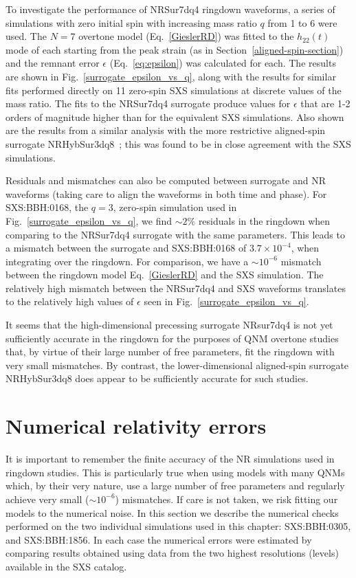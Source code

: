 To investigate the performance of NRSur7dq4 ringdown waveforms, a series of simulations with zero initial spin with increasing mass ratio $q$ from 1 to 6 were used. 
The $N=7$ overtone model (Eq.~\ref{GieslerRD}) was fitted to the $h_{22}(t)$ mode of each starting from the peak strain (as in Section~\ref{aligned-spin-section})
and the remnant error $\epsilon$ (Eq.~\ref{eq:epsilon}) was calculated for each.
The results are shown in Fig.~\ref{surrogate_epsilon_vs_q}, along with the results for similar fits performed directly on 11 zero-spin SXS simulations at discrete values of the mass ratio. 
The fits to the NRSur7dq4 surrogate produce values for $\epsilon$ that are 1-2 orders of magnitude higher than for the equivalent SXS simulations. 
Also shown are the results from a similar analysis with the more restrictive aligned-spin surrogate NRHybSur3dq8~\cite{Varma:2018mmi, Varma:2018aht}; this was found to be in close agreement with the SXS simulations.

Residuals and mismatches can also be computed between surrogate and NR waveforms (taking care to align the waveforms in both time and phase).
For SXS:BBH:0168, the $q=3$, zero-spin simulation used in Fig.~\ref{surrogate_epsilon_vs_q}, we find $\sim 2\%$ residuals in the ringdown when comparing to the NRSur7dq4 surrogate with the same parameters. 
This leads to a mismatch between the surrogate and SXS:BBH:0168 of $3.7 \times 10^{-4}$, when integrating over the ringdown. For comparison, we have a $\sim 10^{-6}$ mismatch between the ringdown model Eq.~\eqref{GieslerRD} and the SXS simulation. The relatively high mismatch between the NRSur7dq4 and SXS waveforms translates to the relatively high values of $\epsilon$ seen in Fig.~\ref{surrogate_epsilon_vs_q}. 

It seems that the high-dimensional precessing surrogate NRsur7dq4 is not yet sufficiently accurate in the ringdown for the purposes of QNM overtone studies that, by virtue of their large number of free parameters, fit the ringdown with very small mismatches. 
By contrast, the lower-dimensional aligned-spin surrogate NRHybSur3dq8 does appear to be sufficiently accurate for such studies.


\section{Numerical relativity errors}\label{NR_error_appendix}

It is important to remember the finite accuracy of the NR simulations used in ringdown studies.
This is particularly true when using models with many QNMs which, by their very nature, use a large number of free parameters and regularly achieve very small ($\sim 10^{-6}$) mismatches.
If care is not taken, we risk fitting our models to the numerical noise. 
In this section we describe the numerical checks performed on the two individual simulations used in this chapter: SXS:BBH:0305, and SXS:BBH:1856.
In each case the numerical errors were estimated by comparing results obtained using data from the two highest resolutions (levels) available in the SXS catalog. 

